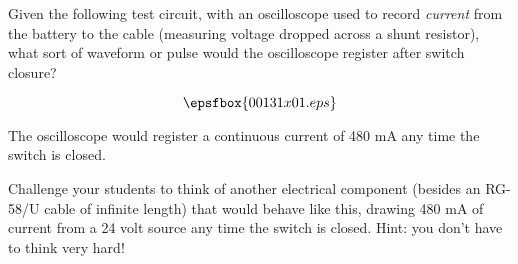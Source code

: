 

Given the following test circuit, with an oscilloscope used to record {\it current} from the battery to the cable (measuring voltage dropped across a shunt resistor), what sort of waveform or pulse would the oscilloscope register after switch closure?

$$\epsfbox{00131x01.eps}$$







The oscilloscope would register a continuous current of 480 mA any time the switch is closed.







Challenge your students to think of another electrical component (besides an RG-58/U cable of infinite length) that would behave like this, drawing 480 mA of current from a 24 volt source any time the switch is closed.  Hint: you don't have to think very hard!




